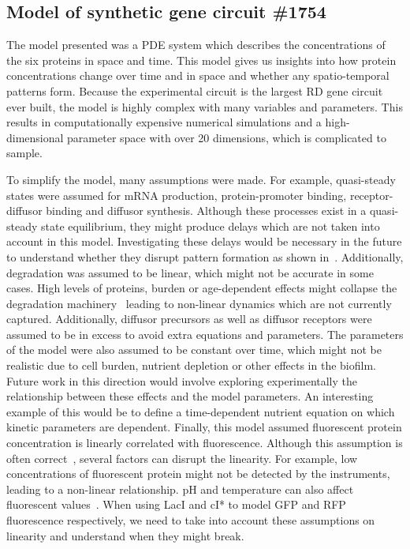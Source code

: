 \subsection{Model of synthetic gene circuit \#1754}
The model presented was a PDE system which describes the concentrations of the six proteins in space and time.
This model gives us insights into how protein concentrations change over time and in space and whether any spatio-temporal patterns form.
Because the experimental circuit is the largest \acrfull{RD} gene circuit ever built, the model is highly complex with many variables and parameters.
This results in computationally expensive numerical simulations and a high-dimensional parameter space with over 20 dimensions, which is complicated to sample.

To simplify the model, many assumptions were made.
For example, quasi-steady states were assumed for mRNA production, protein-promoter binding, receptor-diffusor binding and diffusor synthesis.
Although these processes exist in a quasi-steady state equilibrium, they might produce delays which are not taken into account in this model.
Investigating these delays would be necessary in the future to understand whether they disrupt pattern formation as shown in~\cite{Maini2012}.
Additionally, degradation was assumed to be linear, which might not be accurate in some cases.
High levels of proteins, burden or age-dependent effects might collapse the degradation machinery~\parencite{kintaka2020genetic} leading to non-linear dynamics which are not currently captured.
Additionally, diffusor precursors as well as diffusor receptors were assumed to be in excess to avoid extra equations and parameters.
The parameters of the model were also assumed to be constant over time, which might not be realistic due to cell burden, nutrient depletion or other effects in the biofilm.
Future work in this direction would involve exploring experimentally the relationship between these effects and the model parameters.
An interesting example of this would be to define a time-dependent nutrient equation on which kinetic parameters are dependent.
Finally, this model assumed fluorescent protein concentration is linearly correlated with fluorescence.
Although this assumption is often correct~\parencite{soboleski2005green, csibra2022absolute}, several factors can disrupt the linearity.
For example, low concentrations of fluorescent protein might not be detected by the instruments, leading to a non-linear relationship.
pH and temperature can also affect fluorescent values~\parencite{ward1982spectral}.
When using LacI and cI* to model GFP and RFP fluorescence respectively, we need to take into account these assumptions on linearity and understand when they might break.

